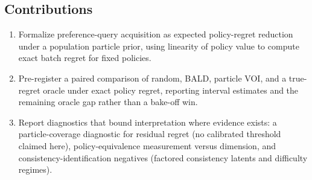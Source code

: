 \subsection{Contributions}
\begin{enumerate}
  \item Formalize preference-query acquisition as expected policy-regret reduction under a
        population particle prior, using linearity of policy value to compute exact batch
        regret for fixed policies.
  \item Pre-register a paired comparison of random, BALD, particle VOI, and a true-regret
        oracle under exact policy regret, reporting interval estimates and the remaining
        oracle gap rather than a bake-off win.
  \item Report diagnostics that bound interpretation where evidence exists: a
        particle-coverage diagnostic for residual regret (no calibrated threshold
        claimed here), policy-equivalence measurement versus dimension, and
        consistency-identification negatives (factored consistency latents and
        difficulty regimes).
\end{enumerate}
